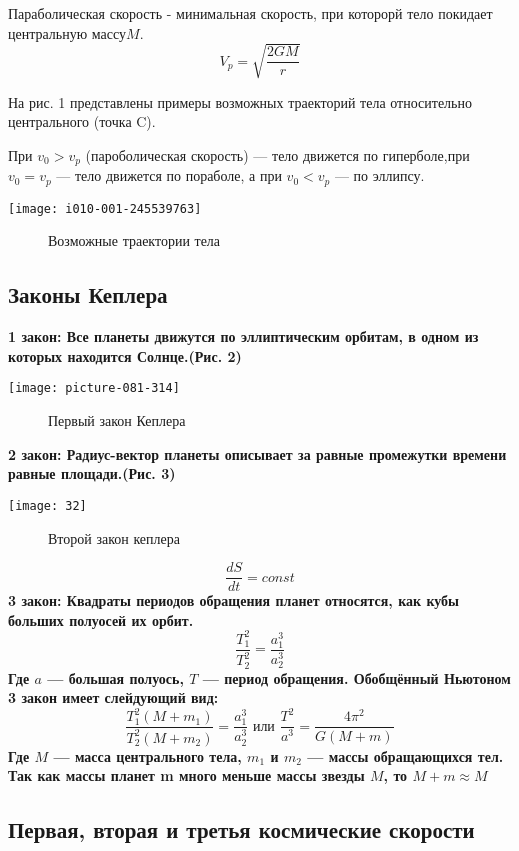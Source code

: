\documentclass[10pt,a5paper]{article}
\begin{document}
Параболическая скорость - минимальная скорость, при которорй тело покидает центральную массу$M$.$$V_p=\sqrt{\frac{2GM}{r}}$$

На рис. 1 представлены примеры возможных траекторий тела относительно центрального (точка C).

При $v_0>v_p$ (пароболическая скорость) --- тело движется по гиперболе,при $v_0=v_p$ --- тело движется по пораболе, а при $v_0<v_p$ --- по эллипсу.
\begin{center}
\texttt{[image: i010-001-245539763]}
\begin{figure}[h!]
\caption{ Возможные траектории тела}
\end{figure}
\end{center}
\subsection*{Законы Кеплера}

\bfseries 1 закон: \mdseries  Все планеты движутся по эллиптическим орбитам, в одном из которых находится Солнце.(Рис. 2)
\begin{center}
\texttt{[image: picture-081-314]}
\begin{figure}[h!]
\caption {Первый закон Кеплера}
\end{figure}
\end{center}

\bfseries 2 закон: \mdseries Радиус-вектор планеты описывает за равные промежутки времени равные площади.(Рис. 3)
\begin{center}
\texttt{[image: 32]}
\begin{figure}[h!]
\caption {Второй закон кеплера}
\end{figure}
\end{center}$$\frac{dS}{dt}=const$$
\bfseries 3 закон: \mdseries Квадраты периодов обращения планет относятся, как кубы больших полуосей их орбит.
$$\frac{T^2_1}{T^2_2}=\frac{a^3_1}{a^3_2}$$
Где $a$ --- большая полуось, $T$ --- период обращения.
Обобщённый Ньютоном 3 закон имеет слейдующий вид:
$$\frac{T^2_1(M+m_1)}{T^2_2(M+m_2)}=\frac{a^3_1}{a^3_2} \text{ или } \frac{T^2}{a^3}=\frac{4\pi^2}{G(M+m)}$$
Где $M$ --- масса центрального тела, $m_1$ и $m_2$ --- массы обращающихся тел. Так как массы планет m много меньше массы звезды $M$, то $M+m\approx M$
\subsection*{Первая, вторая и третья космические скорости} 
\end{document}

